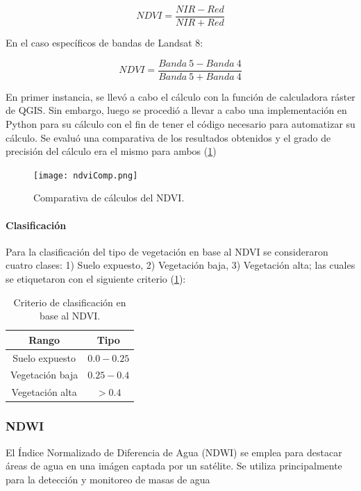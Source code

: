 $$NDVI=\frac{NIR-Red}{NIR+Red}$$

En el caso específicos de bandas de Landsat 8:

$$NDVI=\frac{Banda~5 - Banda~4}{Banda~5 + Banda~4}$$

En primer instancia, se llevó a cabo el cálculo con la función de calculadora ráster de QGIS. Sin embargo, luego se procedió a llevar a cabo una implementación en Python para su cálculo con el fin de tener el código necesario para automatizar su cálculo. Se evaluó una comparativa de los resultados obtenidos y el grado de precisión del cálculo era el mismo para ambos (\figurename \ref{fig:ndvi-comp})

\begin{figure}[H]
	\texttt{[image: ndviComp.png]}
	\centering
	\caption{Comparativa de cálculos del NDVI.}
	\label{fig:ndvi-comp}
\end{figure}

\paragraph{Clasificación} \label{clasificacion}

Para la clasificación del tipo de vegetación en base al NDVI se consideraron cuatro clases: 1) Suelo expuesto, 2) Vegetación baja, 3) Vegetación alta; las cuales se etiquetaron con el siguiente criterio (\tablename    \ref{table:ndvi-criterio}): 

\onehalfspacing
\begin{table}[H]
\begin{center}
	\begin{tabular}{|c | c |} 
		\hline
		\textbf{Rango} & \textbf{Tipo}\\
		\hline
		Suelo expuesto & $0.0-0.25$ \\
		\hline
		Vegetación baja & $0.25-0.4$ \\
		\hline
		Vegetación alta & $> 0.4$ \\
		\hline
	\end{tabular}
\end{center}
\caption{Criterio de clasificación en base al NDVI.}
\label{table:ndvi-criterio}
\end{table}
\singlespacing

\subsubsection{NDWI}

El Índice Normalizado de Diferencia de Agua (NDWI) se emplea para destacar áreas de agua en una imágen captada por un satélite. Se utiliza principalmente para la detección y monitoreo de masas de agua

